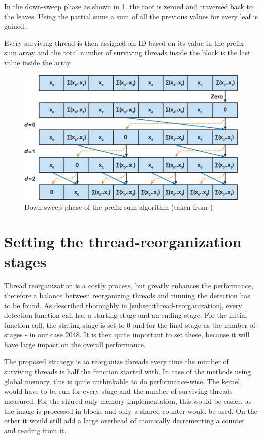 In the down-sweep phase as shown in \ref{fig:sweepdown}, the root is zeroed and traversed back to the leaves. Using the partial sums a sum of all the previous values for every leaf is gained.

Every surviving thread is then assigned an ID based on its value in the prefix-sum array and the total number of surviving threads inside the block is the last value inside the array.

\begin{center}
\begin{figure}[h]
	\centering\includegraphics[width=0.6\linewidth]{fig/sweepdown.jpg}
	\caption{Down-sweep phase of the prefix sum algorithm (taken from \cite{prefixsum})}
	\label{fig:sweepdown}
\end{figure}
\end{center}

\section{Setting the thread-reorganization stages}

Thread reorganization is a costly process, but greatly enhances the performance, therefore a balance between reorganizing threads and running the detection has to be found. As described thoroughly in \ref{subsec:thread-reorganization}, every detection function call has a starting stage and an ending stage. For the initial function call, the stating stage is set to 0 and for the final stage as the number of stages - in our case 2048. It is then quite important to set these, because it will have large impact on the overall performance.

The proposed strategy is to reorganize threads every time the number of surviving threads is half the function started with. In case of the methods using global memory, this is quite unthinkable to do performance-wise. The kernel would have to be run for every stage and the number of surviving threads measured. For the shared-only memory implementation, this would be easier, as the image is processed in blocks and only a shared counter would be used. On the other it would still add a large overhead of atomically decrementing a counter and reading from it.

